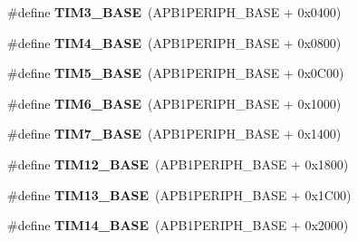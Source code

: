 \begin{DoxyCompactItemize}
\item 
\hypertarget{group___peripheral__memory__map_gaf0c34a518f87e1e505cd2332e989564a}{\#define {\bfseries T\-I\-M3\-\_\-\-B\-A\-S\-E}~(A\-P\-B1\-P\-E\-R\-I\-P\-H\-\_\-\-B\-A\-S\-E + 0x0400)}\label{group___peripheral__memory__map_gaf0c34a518f87e1e505cd2332e989564a}

\item 
\hypertarget{group___peripheral__memory__map_ga56e2d44b0002f316527b8913866a370d}{\#define {\bfseries T\-I\-M4\-\_\-\-B\-A\-S\-E}~(A\-P\-B1\-P\-E\-R\-I\-P\-H\-\_\-\-B\-A\-S\-E + 0x0800)}\label{group___peripheral__memory__map_ga56e2d44b0002f316527b8913866a370d}

\item 
\hypertarget{group___peripheral__memory__map_ga3e1671477190d065ba7c944558336d7e}{\#define {\bfseries T\-I\-M5\-\_\-\-B\-A\-S\-E}~(A\-P\-B1\-P\-E\-R\-I\-P\-H\-\_\-\-B\-A\-S\-E + 0x0\-C00)}\label{group___peripheral__memory__map_ga3e1671477190d065ba7c944558336d7e}

\item 
\hypertarget{group___peripheral__memory__map_ga8268ec947929f192559f28c6bf7d1eac}{\#define {\bfseries T\-I\-M6\-\_\-\-B\-A\-S\-E}~(A\-P\-B1\-P\-E\-R\-I\-P\-H\-\_\-\-B\-A\-S\-E + 0x1000)}\label{group___peripheral__memory__map_ga8268ec947929f192559f28c6bf7d1eac}

\item 
\hypertarget{group___peripheral__memory__map_ga0ebf54364c6a2be6eb19ded6b18b6387}{\#define {\bfseries T\-I\-M7\-\_\-\-B\-A\-S\-E}~(A\-P\-B1\-P\-E\-R\-I\-P\-H\-\_\-\-B\-A\-S\-E + 0x1400)}\label{group___peripheral__memory__map_ga0ebf54364c6a2be6eb19ded6b18b6387}

\item 
\hypertarget{group___peripheral__memory__map_ga33dea32fadbaecea161c2ef7927992fd}{\#define {\bfseries T\-I\-M12\-\_\-\-B\-A\-S\-E}~(A\-P\-B1\-P\-E\-R\-I\-P\-H\-\_\-\-B\-A\-S\-E + 0x1800)}\label{group___peripheral__memory__map_ga33dea32fadbaecea161c2ef7927992fd}

\item 
\hypertarget{group___peripheral__memory__map_gad20f79948e9359125a40bbf6ed063590}{\#define {\bfseries T\-I\-M13\-\_\-\-B\-A\-S\-E}~(A\-P\-B1\-P\-E\-R\-I\-P\-H\-\_\-\-B\-A\-S\-E + 0x1\-C00)}\label{group___peripheral__memory__map_gad20f79948e9359125a40bbf6ed063590}

\item 
\hypertarget{group___peripheral__memory__map_ga862855347d6e1d92730dfe17ee8e90b8}{\#define {\bfseries T\-I\-M14\-\_\-\-B\-A\-S\-E}~(A\-P\-B1\-P\-E\-R\-I\-P\-H\-\_\-\-B\-A\-S\-E + 0x2000)}\label{group___peripheral__memory__map_ga862855347d6e1d92730dfe17ee8e90b8}


\end{DoxyCompactItemize}
